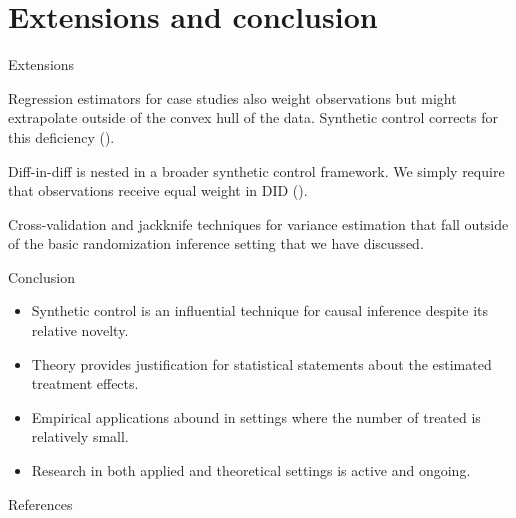 \documentclass[notes,11pt, aspectratio=169]{beamer}
\newenvironment{wideitemize}{\itemize\addtolength{\itemsep}{10pt}}{\enditemize}
\begin{document}
\section{Extensions and conclusion}

\begin{frame}{Extensions}

    \begin{wideitemize}
        \item Regression estimators for case studies also weight observations but might extrapolate
        outside of the convex hull of the data. Synthetic control corrects for this deficiency (\cite{abadie_comparative_2015}).
    
        \item Diff-in-diff is nested in a broader synthetic control
            framework. We simply require that observations receive equal weight in DID (\cite{arkhangelsky_synthetic_2021}).
    
        \item Cross-validation and jackknife techniques for variance estimation that fall outside of the
        basic randomization inference setting that we have discussed.        
    \end{wideitemize}
    
\end{frame}

\begin{frame}{Conclusion}
    \begin{itemize}
        \item Synthetic control is an influential technique for causal inference despite its relative novelty.
        \item Theory provides justification for statistical statements about the estimated treatment effects.
        \item Empirical applications abound in settings where the number of treated is relatively small.
        \item Research in both applied and theoretical settings is active and ongoing.
    \end{itemize}

\end{frame}

\begin{frame}[allowframebreaks]{References}
\printbibliography
\end{frame}
\end{document}

